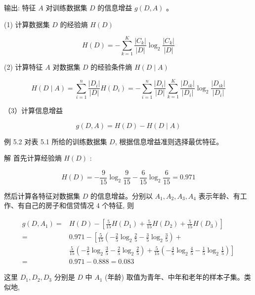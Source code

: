 \documentclass[10pt]{article}
\begin{document}
\begin{CJK*}{UTF8}{bsmi}
输出: 特征 $A$ 对训练数据集 $D$ 的信息增益 $g(D, A)$ 。

(1) 计算数据集 $D$ 的经验熵 $H(D)$


\begin{equation*}
H(D)=-\sum_{k=1}^{K} \frac{\left|C_{k}\right|}{|D|} \log _{2} \frac{\left|C_{k}\right|}{|D|} \tag{5.7}
\end{equation*}


(2) 计算特征 $A$ 对数据集 $D$ 的经验条件熵 $H(D \mid A)$


\begin{equation*}
H(D \mid A)=\sum_{i=1}^{n} \frac{\left|D_{i}\right|}{|D|} H\left(D_{i}\right)=-\sum_{i=1}^{n} \frac{\left|D_{i}\right|}{|D|} \sum_{k=1}^{K} \frac{\left|D_{i k}\right|}{\left|D_{i}\right|} \log _{2} \frac{\left|D_{i k}\right|}{\left|D_{i}\right|} \tag{5.8}
\end{equation*}


（3）计算信息增益


\begin{equation*}
g(D, A)=H(D)-H(D \mid A) \tag{5.9}
\end{equation*}


例 5.2 对表 5.1 所给的训练数据集 $D$, 根据信息增益准则选择最优特征。

解 首先计算经验熵 $H(D)$ :

$$
H(D)=-\frac{9}{15} \log _{2} \frac{9}{15}-\frac{6}{15} \log _{2} \frac{6}{15}=0.971
$$

然后计算各特征对数据集 $D$ 的信息增益。分别以 $A_{1}, A_{2}, A_{3}, A_{4}$ 表示年龄、有工作、有自己的房子和信贷情况 4 个特征, 则

$$
\begin{aligned}
g\left(D, A_{1}\right)= & H(D)-\left[\frac{5}{15} H\left(D_{1}\right)+\frac{5}{15} H\left(D_{2}\right)+\frac{5}{15} H\left(D_{3}\right)\right] \\
= & 0.971-\left[\frac{5}{15}\left(-\frac{2}{5} \log _{2} \frac{2}{5}-\frac{3}{5} \log _{2} \frac{3}{5}\right)+\right. \\
& \left.\frac{5}{15}\left(-\frac{3}{5} \log _{2} \frac{3}{5}-\frac{2}{5} \log _{2} \frac{2}{5}\right)+\frac{5}{15}\left(-\frac{4}{5} \log _{2} \frac{4}{5}-\frac{1}{5} \log _{2} \frac{1}{5}\right)\right] \\
= & 0.971-0.888=0.083
\end{aligned}
$$

这里 $D_{1}, D_{2}, D_{3}$ 分别是 $D$ 中 $A_{1}$ (年龄) 取值为青年、中年和老年的样本子集。类似地,


\end{CJK*}
\end{document}
